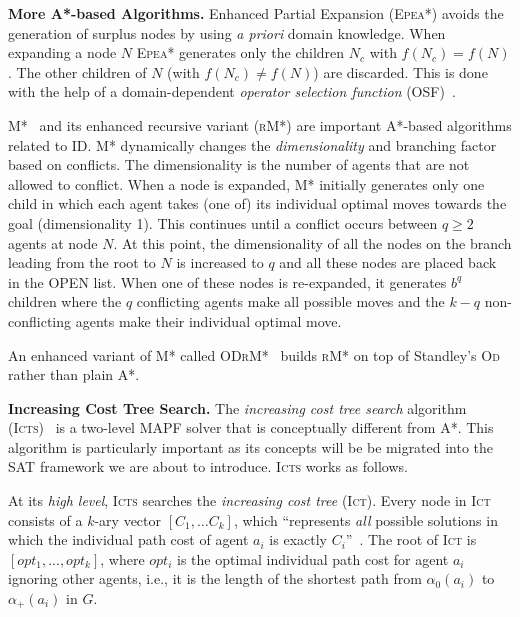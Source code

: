 \documentclass[jair,oneside,11pt]{article}
\begin{document}
{\bf More A*-based Algorithms.} Enhanced Partial Expansion (\textsc{Epea*}) \cite{EPEJAIR} avoids
the generation of surplus nodes by using {\em a priori} domain knowledge.
When expanding a node $N$ \textsc{Epea*} generates only the children $N_c$ with
$f(N_c)=f(N)$. The other children of $N$ (with $f(N_c) \neq f(N)$) are
discarded. This is done with the help of a domain-dependent {\em operator
selection function} (OSF)~\cite{EPEJAIR}.

M*~\cite{WagnerC15} and its enhanced recursive variant (\textsc{rM*}) are important
A*-based algorithms related to ID. M* dynamically changes the {\em
dimensionality} and branching factor based on conflicts. The dimensionality is
the number of agents that are not allowed to conflict. When a node is expanded,
M* initially generates only one child in which each agent takes (one of) its
individual optimal moves towards the goal (dimensionality 1). This continues
until a conflict occurs between $q \geq 2$ agents at node $N$. At this point,
the dimensionality of all the nodes on the branch leading from the root to $N$
is increased to $q$ and all these nodes are placed back in the OPEN list. When one of
these nodes is re-expanded, it generates $b^q$ children where the $q$
conflicting agents make all possible moves and the $k-q$ non-conflicting agents
make their individual optimal move.

An enhanced variant of M* called \textsc{ODrM*}~\cite{DBLP:conf/icra/FernerWC13} builds
\textsc{rM*} on top of Standley's \textsc{Od} rather than plain A*.

\textbf{Increasing Cost Tree Search.} The {\em increasing cost tree search} algorithm (\textsc{Icts})~\cite{DBLP:journals/ai/SharonSGF13} is a two-level MAPF solver that is conceptually different from A*. This algorithm is particularly important as its concepts will be be migrated into the SAT framework we are about to introduce. \textsc{Icts} works as follows.

At its {\em high level}, \textsc{Icts} searches the {\em increasing
cost tree} (\textsc{Ict)}. Every node in \textsc{Ict} consists of a $k$-ary vector $[C_1,
\ldots C_k]$, which ``represents {\em all} possible solutions in which the individual path cost of agent $a_i$ is exactly $C_i$''~\cite{DBLP:journals/ai/SharonSGF13}. The root of \textsc{Ict} is
$[opt_1,...,opt_k]$, where $opt_i$ is the optimal individual path cost for
agent $a_i$ ignoring other agents, i.e., it is the length of the shortest path
from $\alpha_0(a_i)$ to $\alpha_+(a_i)$ in $G$.
\end{document}
